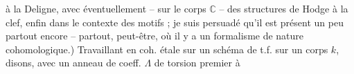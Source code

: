 à la Deligne, avec éventuellement -- sur le corps $\mathbb{C}$ -- des structures de Hodge à la clef, enfin dans le contexte des motifs ; je suis persuadé qu'il est présent
un peu partout encore -- partout, peut-être, où il y a un formalisme de nature cohomologique.) Travaillant en coh. étale sur un schéma 
de t.f. sur un corps $k$, disons, avec un anneau de coeff. $\Lambda$ de torsion premier à  
